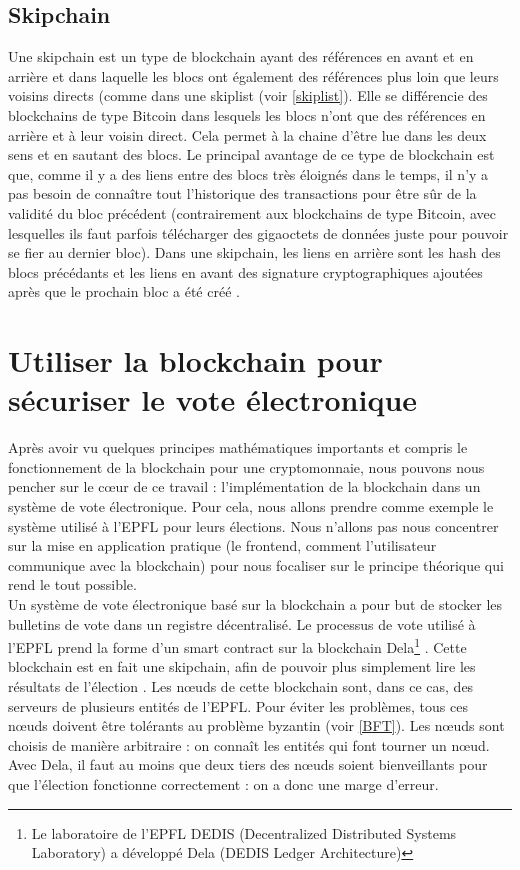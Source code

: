 \documentclass[10pt,a4paper,twoside]{article}
\numberwithin{equation}{section}
\begin{document}
				
	\subsection{Skipchain} \label{skipchain}
		Une skipchain est un type de blockchain ayant des références en avant et en arrière et dans laquelle les blocs ont également des références plus loin que leurs voisins directs (comme dans une skiplist (voir \autoref{skiplist}). Elle se différencie des blockchains de type Bitcoin dans lesquels les blocs n'ont que des références en arrière et à leur voisin direct. Cela permet à la chaine d'être lue dans les deux sens et en sautant des blocs. Le principal avantage de ce type de blockchain est que, comme il y a des liens entre des blocs très éloignés dans le temps, il n'y a pas besoin de connaître tout l'historique des transactions pour être sûr de la validité du bloc précédent (contrairement aux blockchains de type Bitcoin, avec lesquelles ils faut parfois télécharger des gigaoctets de données juste pour pouvoir se fier au dernier bloc). Dans une skipchain, les liens en arrière sont les hash des blocs précédants et les liens en avant des signature cryptographiques ajoutées après que le prochain bloc a été créé \cite{skipchain} \cite{interview}.


\section{Utiliser la blockchain pour sécuriser le vote électronique} \label{alltogether}
	
	Après avoir vu quelques principes mathématiques importants et compris le fonctionnement de la blockchain pour une cryptomonnaie, nous pouvons nous pencher sur le c\oe ur de ce travail : l'implémentation de la blockchain dans un système de vote électronique. Pour cela, nous allons prendre comme exemple le système utilisé à l'EPFL pour leurs élections. Nous n'allons pas nous concentrer sur la mise en application pratique (le frontend, comment l'utilisateur communique avec la blockchain) pour nous focaliser sur le principe théorique qui rend le tout possible.\\
	
	Un système de vote électronique basé sur la blockchain a pour but de stocker les bulletins de vote dans un registre décentralisé. Le processus de vote utilisé à l'EPFL prend la forme d'un smart contract sur la blockchain Dela\footnote{Le laboratoire de l'EPFL DEDIS (Decentralized Distributed Systems Laboratory) a développé Dela (DEDIS Ledger Architecture)} \cite{dvoting}. Cette blockchain est en fait une skipchain, afin de pouvoir plus simplement lire les résultats de l'élection \cite{evoting_epfl}. Les n\oe uds de cette blockchain sont, dans ce cas, des serveurs de plusieurs entités de l'EPFL. Pour éviter les problèmes, tous ces n\oe uds doivent être tolérants au problème byzantin (voir \autoref{BFT}). Les n\oe uds sont choisis de manière arbitraire : on connaît les entités qui font tourner un n\oe ud. Avec Dela, il faut au moins que deux tiers des n\oe uds soient bienveillants pour que l'élection fonctionne correctement : on a donc une marge d'erreur. \cite{evoting_dela} \cite{interview}
		
\end{document}
